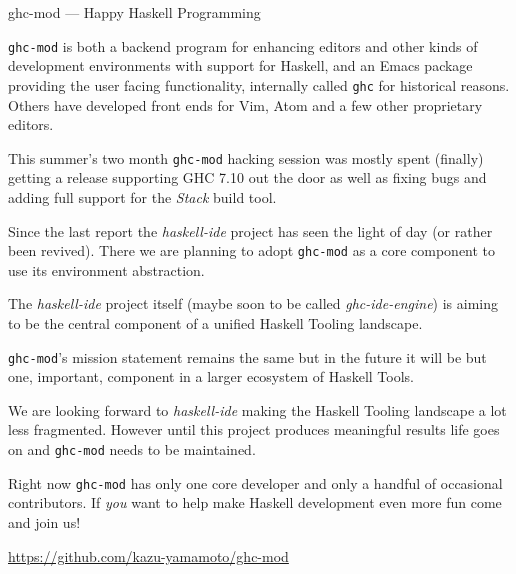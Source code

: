 \begin{hcarentry}[updated]{ghc-mod --- Happy Haskell Programming}
\makeheader

\texttt{ghc-mod} is both a backend program for enhancing editors and other kinds
of development environments with support for Haskell, and an Emacs package
providing the user facing functionality, internally called \texttt{ghc} for
historical reasons. Others have developed front ends for Vim, Atom and a few
other proprietary editors.

This summer's two month \texttt{ghc-mod} hacking session was mostly spent
(finally) getting a release supporting GHC 7.10 out the door as well as fixing
bugs and adding full support for the \textit{Stack} build tool.

Since the last report the \textit{haskell-ide} project has seen the light of day
(or rather been revived). There we are planning to adopt \texttt{ghc-mod} as a
core component to use its environment abstraction.

The \textit{haskell-ide} project itself (maybe soon to be called
\textit{ghc-ide-engine}) is aiming to be the central component of a unified
Haskell Tooling landscape.

\texttt{ghc-mod}'s mission statement remains the same but in the future it will
be but one, important, component in a larger ecosystem of Haskell Tools.

We are looking forward to \textit{haskell-ide} making the Haskell Tooling
landscape a lot less fragmented. However until this project produces meaningful
results life goes on and \texttt{ghc-mod} needs to be maintained.

Right now \texttt{ghc-mod} has only one core developer and only a handful of
occasional contributors. If \textit{you} want to help make Haskell development
even more fun come and join us!

\FurtherReading
  \url{https://github.com/kazu-yamamoto/ghc-mod}
\end{hcarentry}
